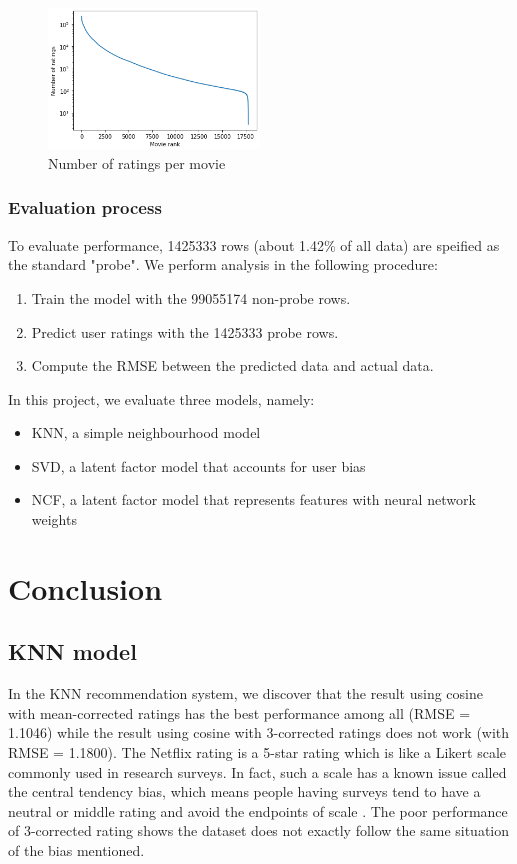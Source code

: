 \documentclass[final]{cvpr}
\begin{document}
\begin{figure}
	\includegraphics[width=0.5\textwidth]{screenshot20210422223229.png}
	\caption{Number of ratings per movie}
	\label{fig:movie-rating-freq}
\end{figure}

\subsubsection{Evaluation process}
To evaluate performance, 1425333 rows (about 1.42\% of all data) are speified as the standard "probe".
We perform analysis in the following procedure:

\begin{enumerate}
	\item Train the model with the 99055174 non-probe rows.
	\item Predict user ratings with the 1425333 probe rows.
	\item Compute the \ac{RMSE} between the predicted data and actual data.
\end{enumerate}

In this project, we evaluate three models, namely:

\begin{itemize}
	\item \ac{KNN}, a simple neighbourhood model
	\item \ac{SVD}, a latent factor model that accounts for user bias
	\item \ac{NCF}, a latent factor model that represents features with neural network weights
\end{itemize}

\section{Conclusion}

\subsection{\ac{KNN} model}
In the KNN recommendation system, we discover that the result using cosine with mean-corrected ratings has the best performance among all (RMSE = 1.1046)
while the result using cosine with 3-corrected ratings does not work (with RMSE = 1.1800).
The Netflix rating is a 5-star rating which is like a Likert scale commonly used in research surveys.
In fact, such a scale has a known issue called the central tendency bias,
which means people having surveys tend to have a neutral or middle rating and avoid the endpoints of scale \cite{stevens1971issues}.
The poor performance of 3-corrected rating shows the dataset does not exactly follow the same situation of the bias mentioned.
\end{document}
